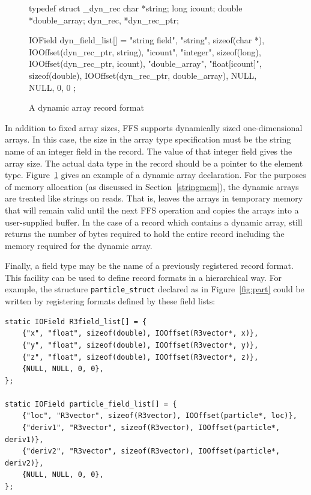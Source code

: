 \begin{figure}
\begin{WrapCode}
typedef struct _dyn_rec {
    char        *string;
    long        icount;
    double      *double_array;
} dyn_rec, *dyn_rec_ptr;

IOField dyn_field_list[] = {
    {"string field", "string", sizeof(char *), 
      IOOffset(dyn_rec_ptr, string)},
    {"icount", "integer", sizeof(long), 
      IOOffset(dyn_rec_ptr, icount)},
    {"double_array", "float[icount]", sizeof(double), 
      IOOffset(dyn_rec_ptr, double_array)},
    { NULL, NULL, 0, 0}
};
\end{WrapCode}
\caption{A dynamic array record format\label{fig:dynarray}}
\end{figure}

In addition to fixed array sizes, FFS supports dynamically sized
one-dimensional arrays.  In this case, the size in the array type
specification must be the string name of an integer field in the record.
The value of that integer field gives the array size.  The actual data type
in the record should be a pointer to the element type.
Figure~\ref{fig:dynarray} gives an example of a dynamic array declaration.
For the purposes of memory allocation (as discussed in
Section~\ref{stringmem}), the dynamic arrays are treated like strings on
reads.  That is,  leaves the arrays in temporary
memory that will remain valid until the next FFS operation and
 copies the arrays into a user-supplied
buffer.  In the case of a record which contains a dynamic array,
 still returns the number of bytes
required to hold the entire record including the memory required for the
dynamic array.


Finally, a field type may be the name of a previously registered record
format.  This facility can be used to define record formats in a hierarchical
way.  For example, the structure {\tt particle\_struct} declared as in
Figure~\ref{fig:part} could be written by registering formats defined by these
field lists:
\begin{verbatim}
static IOField R3field_list[] = {
    {"x", "float", sizeof(double), IOOffset(R3vector*, x)},
    {"y", "float", sizeof(double), IOOffset(R3vector*, y)},
    {"z", "float", sizeof(double), IOOffset(R3vector*, z)},
    {NULL, NULL, 0, 0},
};

static IOField particle_field_list[] = {
    {"loc", "R3vector", sizeof(R3vector), IOOffset(particle*, loc)},
    {"deriv1", "R3vector", sizeof(R3vector), IOOffset(particle*, deriv1)},
    {"deriv2", "R3vector", sizeof(R3vector), IOOffset(particle*, deriv2)},
    {NULL, NULL, 0, 0},
};
\end{verbatim}


